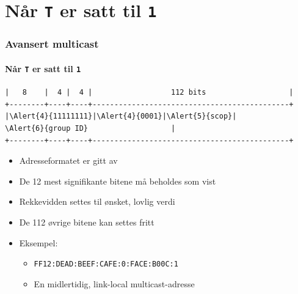 \section{Når \texttt{T} er satt til \texttt{1}}
\begin{frame}[fragile]%
  \frametitle{Avansert multicast}
  \framesubtitle{Når \texttt{T} er satt til \texttt{1}}
  \pause
\begin{Verbatim}[commandchars=\\\{\},fontsize=\tiny]
|   8    |  4 |  4 |                  112 bits                   |
+--------+----+----+---------------------------------------------+
|\Alert{4}{11111111}|\Alert{4}{0001}|\Alert{5}{scop}|                  \Alert{6}{group ID}                   |
+--------+----+----+---------------------------------------------+
\end{Verbatim}
  \pause
  \begin{itemize}[<+->]
  \item Adresseformatet er gitt av 
  \item \alert<4>{De 12 mest signifikante bitene} må beholdes som vist
  \item \alert<5>{Rekkevidden} settes til ønsket, lovlig verdi
  \item \alert<6>{De 112 øvrige bitene} kan settes fritt
  \item Eksempel:
    \begin{itemize}[<+->]
    \item \texttt{FF\alert<9>{1}\alert<10>{2}:DEAD:BEEF:CAFE:0:FACE:B00C:1}
    \item En \alert<9>{midlertidig}, \alert<10>{link-local} multicast-adresse
    \end{itemize}
  \end{itemize}
\end{frame}

